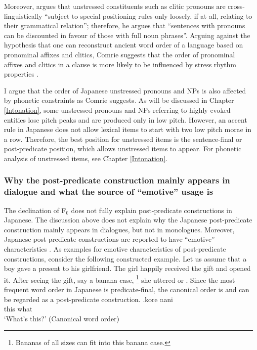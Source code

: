 Moreover,  argues that unstressed constituents such as clitic pronouns are cross-linguistically ``subject to special positioning rules only loosely, if at all, relating to their grammatical relation'';
therefore, he argues that ``sentences with pronouns can be discounted in favour of those with full noun phrases''.
Arguing against the hypothesis \cite{givon79}
that one can reconstruct ancient word order of a language based on pronominal affixes and clitics,
Comrie suggests that the order of pronominal affixes and clitics in a clause is more likely to be influenced by stress rhythm properties \cite[][218]{comrie89}.

I argue that the order of Japanese unstressed pronouns and NPs is also affected by phonetic constraints as Comrie suggests.
As will be discussed in Chapter \ref{Intonation},
some unstressed pronouns and NPs referring to highly evoked entities
lose pitch peaks and are produced only in low pitch.
However, an accent rule in Japanese does not allow lexical items to start with two low pitch morae in a row.
Therefore, the best position for unstressed items is the sentence-final or post-predicate position,
which allows unstressed items to appear.
For phonetic analysis of unstressed items,
see Chapter \ref{Intonation}.


\subsubsection{Why the post-predicate construction mainly appears in dialogue and what the source of ``emotive'' usage is}

The declination of F$_{0}$ does not fully explain post-predicate constructions in Japanese.%
The discussion above does not explain why the Japanese post-predicate construction mainly appears in dialogues, but not in monologues.
Moreover, Japanese post-predicate constructions are reported to have ``emotive'' characteristics \cite{ono07}.
As examples for emotive characteristics of post-predicate constructions, consider the following constructed example.
Let us assume that a boy gave a present to his girlfriend.
The girl happily received the gift and opened it.
After seeing the gift, say a banana case,%
	\footnote{
	Bananas of all sizes can fit into this banana case.
	}
she uttered \Next or \NNext.
Since the most frequent word order in Japanese is predicate-final,
the canonical order is \Next and
\NNext can be regarded as a post-predicate construction.
%
\exg.\label{korenani}kore nani \\
	this what \\
	`What's this?'
	\hfill{(Canonical word order)}

